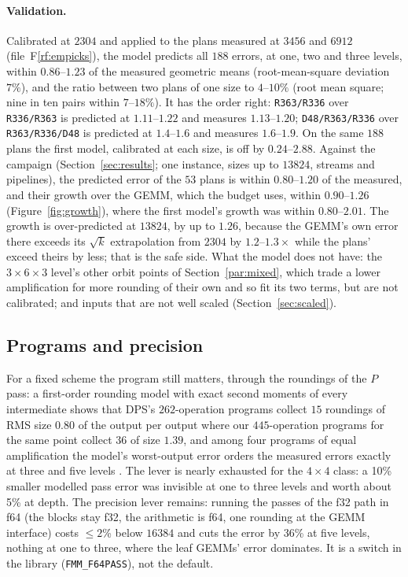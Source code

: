 \documentclass[11pt]{article}
\newcommand{\rf}[1]{F\ref{rf:#1}}
\newcommand{\lv}[1]{\texttt{#1}}
\begin{document}
\paragraph{Validation.}
Calibrated at $2304$ and applied to the plans measured at $3456$ and $6912$
(file~\rf{empicks}), the model predicts all $188$ errors, at one, two and
three levels, within $0.86$--$1.23$ of the measured geometric means
(root-mean-square deviation $7\%$), and the ratio between two plans of one
size to $4$--$10\%$ (root mean square; nine in ten pairs within
$7$--$18\%$).  It has the order right: \lv{R363/R336} over \lv{R336/R363}
is predicted at $1.11$--$1.22$ and measures $1.13$--$1.20$;
\lv{D48/R363/R336} over \lv{R363/R336/D48} is predicted at $1.4$--$1.6$ and
measures $1.6$--$1.9$.  On the same $188$ plans the first model, calibrated
at each size, is off by $0.24$--$2.88$.  Against the campaign
(Section~\ref{sec:results}; one instance, sizes up to $13824$, streams and
pipelines), the predicted error of the $53$ plans is within $0.80$--$1.20$
of the measured, and their growth over the GEMM, which the budget uses,
within $0.90$--$1.26$ (Figure~\ref{fig:growth}), where the first model's
growth was within $0.80$--$2.01$.  The growth is over-predicted at $13824$,
by up to $1.26$, because the GEMM's own error there exceeds its $\sqrt{k}$
extrapolation from $2304$ by $1.2$--$1.3\times$ while the plans' exceed
theirs by less; that is the safe side.  What the model does not have: the
$3\times6\times3$ level's other orbit points of
Section~\ref{par:mixed}, which trade a lower amplification for more rounding
of their own and so fit its two terms, but are not calibrated; and inputs
that are not well scaled (Section~\ref{sec:scaled}).

\subsection{Programs and precision}

For a fixed scheme the program still matters, through the roundings of the
$P$ pass: a first-order rounding model with exact second moments of every
intermediate shows that DPS's $262$-operation programs collect $15$ roundings
of RMS size $0.80$ of the output per output where our $445$-operation
programs for the same point collect $36$ of size $1.39$, and among four
programs of equal amplification the model's worst-output error orders the
measured errors exactly at three and five levels \cite{S26b}.  The lever is
nearly exhausted for the $4\times4$ class: a 10\% smaller modelled pass
error was invisible at one to three levels and worth about 5\% at depth.  The
precision lever remains: running the passes of the f32 path in f64 (the
blocks stay f32, the arithmetic is f64, one rounding at the GEMM interface)
costs $\le2$\% below $16384$ and cuts the error by 36\% at five levels, nothing
at one to three, where the leaf GEMMs' error dominates.  It is a switch in the
library (\texttt{FMM\_F64PASS}), not the default.
\end{document}
